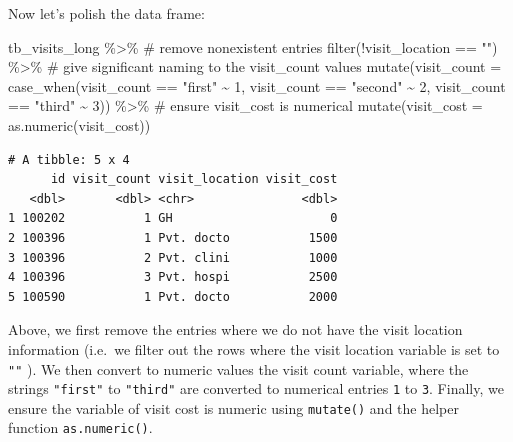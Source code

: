 \documentclass[
  letterpaper,
  DIV=11,
  numbers=noendperiod]{scrreprt}
\newenvironment{Shaded}{\begin{snugshade}}{\end{snugshade}}
\newcommand{\AttributeTok}[1]{\textcolor[rgb]{0.40,0.45,0.13}{#1}}
\newcommand{\CommentTok}[1]{\textcolor[rgb]{0.37,0.37,0.37}{#1}}
\newcommand{\DecValTok}[1]{\textcolor[rgb]{0.68,0.00,0.00}{#1}}
\newcommand{\FunctionTok}[1]{\textcolor[rgb]{0.28,0.35,0.67}{#1}}
\newcommand{\NormalTok}[1]{\textcolor[rgb]{0.00,0.23,0.31}{#1}}
\newcommand{\SpecialCharTok}[1]{\textcolor[rgb]{0.37,0.37,0.37}{#1}}
\newcommand{\StringTok}[1]{\textcolor[rgb]{0.13,0.47,0.30}{#1}}
\begin{document}
Now let's polish the data frame:

\begin{Shaded}
\begin{Highlighting}[]
\NormalTok{tb\_visits\_long }\SpecialCharTok{\%\textgreater{}\%} 
  \CommentTok{\# remove nonexistent entries}
  \FunctionTok{filter}\NormalTok{(}\SpecialCharTok{!}\NormalTok{visit\_location }\SpecialCharTok{==} \StringTok{""}\NormalTok{) }\SpecialCharTok{\%\textgreater{}\%} 
  \CommentTok{\# give significant naming to the visit\_count values}
  \FunctionTok{mutate}\NormalTok{(}\AttributeTok{visit\_count =} \FunctionTok{case\_when}\NormalTok{(visit\_count }\SpecialCharTok{==} \StringTok{"first"} \SpecialCharTok{\textasciitilde{}} \DecValTok{1}\NormalTok{, }
\NormalTok{                                 visit\_count }\SpecialCharTok{==} \StringTok{"second"} \SpecialCharTok{\textasciitilde{}} \DecValTok{2}\NormalTok{, }
\NormalTok{                                 visit\_count }\SpecialCharTok{==} \StringTok{"third"} \SpecialCharTok{\textasciitilde{}} \DecValTok{3}\NormalTok{)) }\SpecialCharTok{\%\textgreater{}\%} 
  \CommentTok{\# ensure visit\_cost is numerical}
  \FunctionTok{mutate}\NormalTok{(}\AttributeTok{visit\_cost =} \FunctionTok{as.numeric}\NormalTok{(visit\_cost))}
\end{Highlighting}
\end{Shaded}

\begin{verbatim}
# A tibble: 5 x 4
      id visit_count visit_location visit_cost
   <dbl>       <dbl> <chr>               <dbl>
1 100202           1 GH                      0
2 100396           1 Pvt. docto           1500
3 100396           2 Pvt. clini           1000
4 100396           3 Pvt. hospi           2500
5 100590           1 Pvt. docto           2000
\end{verbatim}

Above, we first remove the entries where we do not have the visit
location information (i.e.~we filter out the rows where the visit
location variable is set to \texttt{""} ). We then convert to numeric
values the visit count variable, where the strings \texttt{"first"} to
\texttt{"third"} are converted to numerical entries \texttt{1} to
\texttt{3}. Finally, we ensure the variable of visit cost is numeric
using \texttt{mutate()} and the helper function \texttt{as.numeric()}.
\end{document}
